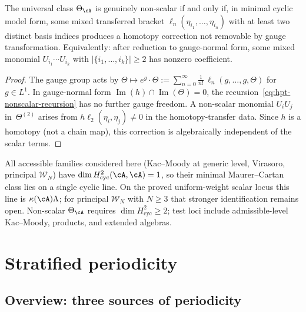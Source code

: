 \begin{proposition}
\label{prop:non-scalar-criterion}
The universal class $\Theta_\cA$ is genuinely non-scalar
if and only if, in minimal cyclic model form, some mixed
transferred bracket
$\ell_n(\eta_{i_1}, \ldots, \eta_{i_n})$ with at least two
distinct basis indices produces a homotopy correction not
removable by gauge transformation.
Equivalently: after reduction to gauge-normal form,
some mixed monomial
$U_{i_1} \cdots U_{i_k}$ with $|\{i_1, \ldots, i_k\}| \geq 2$
has nonzero coefficient.
\end{proposition}

\begin{proof}
The gauge group acts by
$\Theta \mapsto e^{g} \cdot \Theta :=
\sum_{n=0}^\infty \frac{1}{n!}\, \ell_n(g, \ldots, g, \Theta)$
for $g \in L^1$. In gauge-normal form
$\operatorname{Im}(h) \cap \operatorname{Im}(\Theta) = 0$,
the recursion~\eqref{eq:hpt-nonscalar-recursion} has no
further gauge freedom. A non-scalar monomial $U_i U_j$
in~$\Theta^{(2)}$ arises from
$h\ell_2(\eta_i, \eta_j) \neq 0$ in the homotopy-transfer
data. Since $h$ is a homotopy (not a chain map), this
correction is algebraically independent of the scalar terms.
\end{proof}

\begin{remark}
\label{rem:non-scalar-landscape}
All accessible families considered here (Kac--Moody at generic
level, Virasoro, principal $\mathcal{W}_N$) have
$\dim H^2_{\mathrm{cyc}}(\cA,\cA) = 1$, so their minimal
Maurer--Cartan class lies on a single cyclic line. On the proved
uniform-weight scalar locus this line is
$\kappa(\cA)\Lambda$; for principal $\mathcal{W}_N$ with $N\geq 3$
that stronger identification remains open. Non-scalar
$\Theta_\cA$ requires $\dim H^2_{\mathrm{cyc}} \geq 2$; test loci
include admissible-level Kac--Moody, products, and extended
algebras.
\end{remark}

\section{Stratified periodicity}

\subsection{Overview: three sources of periodicity}

